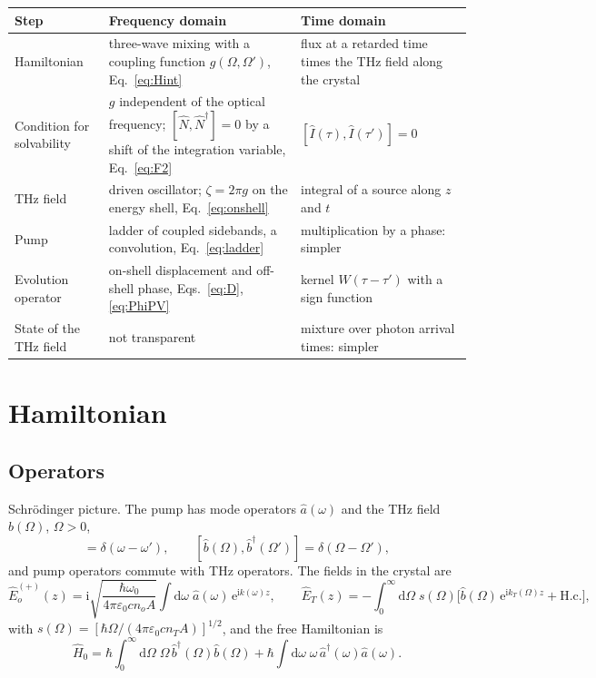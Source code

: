\documentclass[aps,pra,onecolumn,notitlepage,11pt,amsmath,amssymb,nofootinbib]{revtex4-2}
\newcommand{\Nop}{\hat N}
\newcommand{\Iop}{\hat I}
\newcommand{\dd}{\mathrm{d}}
\newcommand{\ee}{\mathrm{e}}
\newcommand{\ii}{\mathrm{i}}
\begin{document}
\begin{center}
\begin{tabular}{R{0.30\textwidth}R{0.31\textwidth}R{0.31\textwidth}}
\hline\hline
Step & Frequency domain & Time domain\\
\hline
Hamiltonian & three-wave mixing with a coupling function $g(\Omega,\Omega')$, Eq.~\eqref{eq:Hint} & flux at a retarded time times the THz field along the crystal\\[4pt]
Condition for solvability & $g$ independent of the optical frequency; $[\Nop,\Nop^\dagger]=0$ by a shift of the integration variable, Eq.~\eqref{eq:F2} & $[\Iop(\tau),\Iop(\tau')]=0$\\[4pt]
THz field & driven oscillator; $\zeta=2\pi g$ on the energy shell, Eq.~\eqref{eq:onshell} & integral of a source along $z$ and $t$\\[4pt]
Pump & ladder of coupled sidebands, a convolution, Eq.~\eqref{eq:ladder} & multiplication by a phase: simpler\\[4pt]
Evolution operator & on-shell displacement and off-shell phase, Eqs.~\eqref{eq:D}, \eqref{eq:PhiPV} & kernel $W(\tau-\tau')$ with a sign function\\[4pt]
State of the THz field & not transparent & mixture over photon arrival times: simpler\\
\hline\hline
\end{tabular}
\end{center}

\section{Hamiltonian}
\label{sec:H}

\subsection{Operators}

Schr\"odinger picture. The pump has mode operators $\hat a(\omega)$ and the
THz field $\hat b(\Omega)$, $\Omega>0$,
\begin{equation}
[\hat a(\omega),\hat a^\dagger(\omega')]=\delta(\omega-\omega'),\qquad
[\hat b(\Omega),\hat b^\dagger(\Omega')]=\delta(\Omega-\Omega'),
\end{equation}
and pump operators commute with THz operators. The fields in the crystal are
\begin{equation}
\hat E_o^{(+)}(z)=\ii\sqrt{\frac{\hbar\omega_0}{4\pi\varepsilon_0cn_oA}}
\int\!\dd\omega\;\hat a(\omega)\,\ee^{\ii k(\omega)z},\qquad
\hat E_T(z)=-\int_0^\infty\!\!\dd\Omega\;s(\Omega)\Big[\hat b(\Omega)\,\ee^{\ii k_T(\Omega)z}+\mathrm{H.c.}\Big],
\label{eq:fields}
\end{equation}
with $s(\Omega)=[\hbar\Omega/(4\pi\varepsilon_0cn_TA)]^{1/2}$, and the free
Hamiltonian is
\begin{equation}
\hat H_0=\hbar\int_0^\infty\!\!\dd\Omega\;\Omega\,\hat b^\dagger(\Omega)\hat b(\Omega)
+\hbar\int\!\dd\omega\;\omega\,\hat a^\dagger(\omega)\hat a(\omega).
\label{eq:H0}
\end{equation}
\end{document}
